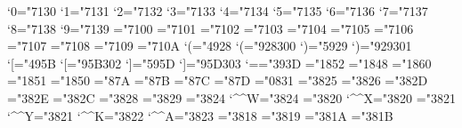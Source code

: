 \newfam\euexfam %
\newfam\frfam %
\newfam\cmfam %
\def\hat{\mathaccent"95E }
\def\tilde{\mathaccent"A7E }
\mathcode`0="7130
\mathcode`1="7131
\mathcode`2="7132
\mathcode`3="7133
\mathcode`4="7134
\mathcode`5="7135
\mathcode`6="7136
\mathcode`7="7137
\mathcode`8="7138
\mathcode`9="7139
\mathchardef\Gamma="7100
\mathchardef\Delta="7101
\mathchardef\Theta="7102
\mathchardef\Lambda="7103
\mathchardef\Xi="7104
\mathchardef\Pi="7105
\mathchardef\Sigma="7106
\mathchardef\Upsilon="7107
\mathchardef\Phi="7108
\mathchardef\Psi="7109
\mathchardef\Omega="710A
\let\varsigma=\sigma \let\varrho=\rho %
\mathcode`(="4928 \delcode`(="928300
\mathcode`)="5929 \delcode`)="929301
\mathcode`[="495B \delcode`[="95B302
\mathcode`]="595D \delcode`]="95D303
\mathcode`=="393D
\mathchardef\intop="1852
\mathchardef\ointop="1848
\mathchardef\coprod="1860
\mathchardef\prod="1851
\mathchardef\sum="1850
\mathchardef\braceld="87A \mathchardef\bracerd="87B
\mathchardef\bracelu="87C \mathchardef\braceru="87D
\mathchardef\infty="0831
\mathchardef\nearrow="3825
\mathchardef\searrow="3826
\mathchardef\nwarrow="382D
\mathchardef\swarrow="382E
\mathchardef\Leftrightarrow="382C
\mathchardef\Leftarrow="3828
\mathchardef\Rightarrow="3829
\mathchardef\leftrightarrow="3824 \mathcode`\^^W="3824
\mathchardef\leftarrow="3820 \let\gets=\leftarrow \mathcode`\^^X="3820
\mathchardef\rightarrow="3821 \let\to=\rightarrow \mathcode`\^^Y="3821
\def\uparrow{\delimiter"3822378 } \mathcode`\^^K="3822
\def\downarrow{\delimiter"3823379 } \mathcode`\^^A="3823
\def\updownarrow{\delimiter"386C33F }
\def\Uparrow{\delimiter"382A37E }
\def\Downarrow{\delimiter"382B37F }
\def\Updownarrow{\delimiter"386D377 }
\mathchardef\leftharpoonup="3818
\mathchardef\leftharpoondown="3819
\mathchardef\rightharpoonup="381A
\mathchardef\rightharpoondown="381B

\def\set_families#1#2#3{%
  \textfont0=\macro{#1_rm}\scriptfont0=\macro{#2_rm}%
    \scriptscriptfont0=\macro{#3_rm}%
  \textfont1=\macro{#1_i}\scriptfont1=\macro{#2_i}%
    \scriptscriptfont1=\macro{#3_i}%
  \textfont2=\macro{#1_sy}\scriptfont2=\macro{#2_sy}%
    \scriptscriptfont2=\macro{#3_sy}%
  \textfont3=\macro{#1_ex}\scriptfont3=\macro{#1_ex}%
    \scriptscriptfont3=\macro{#1_ex}%
  \textfont\bffam=\macro{#1_bf}%
  \textfont\itfam=\macro{#1_it}%
  \textfont\ttfam=\macro{#1_tt}%
  \textfont\frfam=\macro{#1_fr}\scriptfont\frfam=\macro{#2_fr}%
    \scriptscriptfont\frfam=\macro{#3_fr}%
  \textfont\euexfam=\macro{#1_euex}\scriptfont\euexfam=\macro{#2_euex}%
  \textfont\cmfam=\macro{#1_cm}\scriptfont\cmfam=\macro{#2_cm}%
    \scriptscriptfont\cmfam=\macro{#3_cm}%
}

